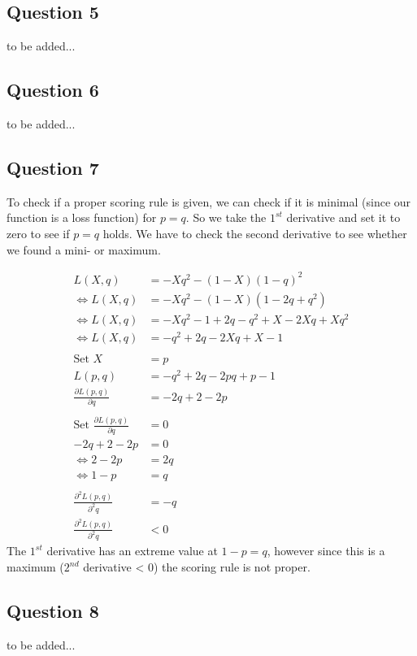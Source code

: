 \documentclass[../main/Notes.tex]{subfiles}
\begin{document}
\subsection*{Question 5}
to be added...



\subsection*{Question 6}
to be added...



\subsection*{Question 7}
To check if a proper scoring rule is given, we can check if it is minimal (since our function is a loss function) for $p=q$. So we take the $1^{st}$ derivative and set it to zero to see if $p=q$ holds. We have to check the second derivative to see whether we found a mini- or maximum.

\begin{align*}
                L(X,q) &= -Xq^2-(1-X)(1-q)^2 \\
\Leftrightarrow L(X,q) &= -Xq^2-(1-X)(1-2q+q^2) \\
\Leftrightarrow L(X,q) &= -Xq^2-1+2q-q^2+X-2Xq+Xq^2 \\
\Leftrightarrow L(X,q) &= -q^2+2q-2Xq+X-1 \\
\\
\text{Set }X&=p \\
L(p,q) &= -q^2+2q-2pq+p-1 \\
\frac{\partial L(p,q)}{\partial q} &= -2q+2-2p \\
\\
\text{Set }\frac{\partial L(p,q)}{\partial q}&=0 \\
-2q+2-2p &= 0\\
\Leftrightarrow 2-2p&=2q \\
\Leftrightarrow 1-p&=q \\
\\
\frac{\partial^2 L(p,q)}{\partial^2 q} &= -q \\
\frac{\partial^2 L(p,q)}{\partial^2 q} &< 0
\end{align*}
The $1^{st}$ derivative has an extreme value at $1-p=q$, however since this is a maximum ($2^{nd}$ derivative < 0) the scoring rule is not proper.



\subsection*{Question 8}
to be added...
\end{document}
